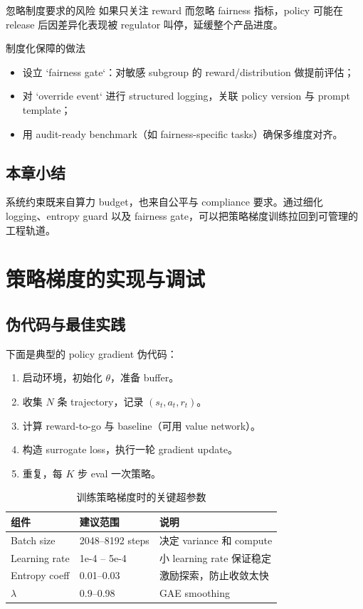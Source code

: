 \documentclass[a4paper]{article}
\begin{document}
\begin{warningbox}{忽略制度要求的风险}
如果只关注 reward 而忽略 fairness 指标，policy 可能在 release 后因差异化表现被 regulator 叫停，延缓整个产品进度。
\end{warningbox}

\begin{knowledgebox}{制度化保障的做法}
\begin{itemize}
    \item 设立 `fairness gate`：对敏感 subgroup 的 reward/distribution 做提前评估；
    \item 对 `override event` 进行 structured logging，关联 policy version 与 prompt template；
    \item 用 audit-ready benchmark（如 fairness-specific tasks）确保多维度对齐。
\end{itemize}
\end{knowledgebox}

\subsection{本章小结}
系统约束既来自算力 budget，也来自公平与 compliance 要求。通过细化 logging、entropy guard 以及 fairness gate，可以把策略梯度训练拉回到可管理的工程轨道。

\section{策略梯度的实现与调试}
\subsection{伪代码与最佳实践}
下面是典型的 policy gradient 伪代码：
\begin{enumerate}
    \item 启动环境，初始化 $\theta$，准备 buffer。
    \item 收集 $N$ 条 trajectory，记录 $(s_t,a_t,r_t)$。
    \item 计算 reward-to-go 与 baseline（可用 value network）。
    \item 构造 surrogate loss，执行一轮 gradient update。
    \item 重复，每 $K$ 步 eval 一次策略。
\end{enumerate}

\begin{table}[H]
\centering
\small
\begin{tabular}{p{}p{}p{}}
\toprule
组件 & 建议范围 & 说明 \\
\midrule
Batch size & 2048--8192 steps & 决定 variance 和 compute \\
Learning rate & 1e-4 -- 5e-4 & 小 learning rate 保证稳定 \\
Entropy coeff & 0.01--0.03 & 激励探索，防止收敛太快 \\
$\lambda$ & 0.9--0.98 & GAE smoothing \\
\bottomrule
\end{tabular}
\caption{训练策略梯度时的关键超参数}
\end{table}
\end{document}

